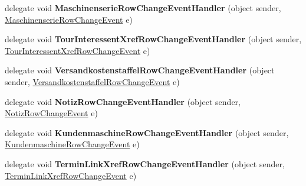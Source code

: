 \begin{DoxyCompactItemize}
\item 
delegate void {\bfseries Maschinenserie\+Row\+Change\+Event\+Handler} (object sender, \hyperlink{class_products_1_1_data_1_1ds_sage_1_1_maschinenserie_row_change_event}{Maschinenserie\+Row\+Change\+Event} e)\hypertarget{class_products_1_1_data_1_1ds_sage_ab7c5fbc8c7e512ddc8dd1fe132cc21fa}{}\label{class_products_1_1_data_1_1ds_sage_ab7c5fbc8c7e512ddc8dd1fe132cc21fa}

\item 
delegate void {\bfseries Tour\+Interessent\+Xref\+Row\+Change\+Event\+Handler} (object sender, \hyperlink{class_products_1_1_data_1_1ds_sage_1_1_tour_interessent_xref_row_change_event}{Tour\+Interessent\+Xref\+Row\+Change\+Event} e)\hypertarget{class_products_1_1_data_1_1ds_sage_ab9245c6054d531b2f68e2f6acbb9d4fe}{}\label{class_products_1_1_data_1_1ds_sage_ab9245c6054d531b2f68e2f6acbb9d4fe}

\item 
delegate void {\bfseries Versandkostenstaffel\+Row\+Change\+Event\+Handler} (object sender, \hyperlink{class_products_1_1_data_1_1ds_sage_1_1_versandkostenstaffel_row_change_event}{Versandkostenstaffel\+Row\+Change\+Event} e)\hypertarget{class_products_1_1_data_1_1ds_sage_a8abb1b4738acba2cbb55ef9b57e1edbe}{}\label{class_products_1_1_data_1_1ds_sage_a8abb1b4738acba2cbb55ef9b57e1edbe}

\item 
delegate void {\bfseries Notiz\+Row\+Change\+Event\+Handler} (object sender, \hyperlink{class_products_1_1_data_1_1ds_sage_1_1_notiz_row_change_event}{Notiz\+Row\+Change\+Event} e)\hypertarget{class_products_1_1_data_1_1ds_sage_a0ac7fdc2cf6f32cfa92862d405e66c64}{}\label{class_products_1_1_data_1_1ds_sage_a0ac7fdc2cf6f32cfa92862d405e66c64}

\item 
delegate void {\bfseries Kundenmaschine\+Row\+Change\+Event\+Handler} (object sender, \hyperlink{class_products_1_1_data_1_1ds_sage_1_1_kundenmaschine_row_change_event}{Kundenmaschine\+Row\+Change\+Event} e)\hypertarget{class_products_1_1_data_1_1ds_sage_a3dbd29a1687f7714d70e723ba9502906}{}\label{class_products_1_1_data_1_1ds_sage_a3dbd29a1687f7714d70e723ba9502906}

\item 
delegate void {\bfseries Termin\+Link\+Xref\+Row\+Change\+Event\+Handler} (object sender, \hyperlink{class_products_1_1_data_1_1ds_sage_1_1_termin_link_xref_row_change_event}{Termin\+Link\+Xref\+Row\+Change\+Event} e)\hypertarget{class_products_1_1_data_1_1ds_sage_a50664fa7232c78780da38e8ef242c741}{}\label{class_products_1_1_data_1_1ds_sage_a50664fa7232c78780da38e8ef242c741}


\end{DoxyCompactItemize}
